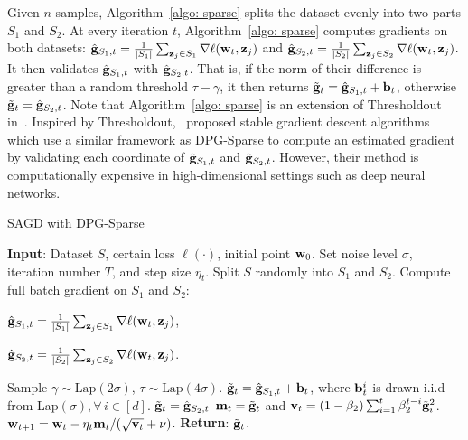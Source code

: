 \documentclass[11pt]{article}
\begin{document}
Given $n$ samples, Algorithm~\ref{algo: sparse} splits the dataset evenly into two parts $S_1$ and $S_2$. At every iteration $t$, Algorithm~\ref{algo: sparse}  computes gradients on both datasets:
$\hat {\mathbf{g}}_{S_1,t} = \frac{1}{|S_1|} \sum_{\mathbf{z}_j \in S_1}\nabla \ell(\mathbf{w}_t, \mathbf{z}_j)$ and $\hat {\mathbf{g}}_{S_2,t} = \frac{1}{|S_2|} \sum_{\mathbf{z}_j \in S_2}\nabla \ell(\mathbf{w}_t, \mathbf{z}_j)$.
It then validates $\hat {\mathbf{g}}_{S_1,t} $ with $\hat {\mathbf{g}}_{S_2,t}$. That is, if the norm of their difference is greater than a random threshold $\tau-\gamma$, it then returns $\tilde {\mathbf{g}}_t = \hat {\mathbf{g}}_{S_1,t} + \mathbf{b}_t$, otherwise $\tilde {\mathbf{g}}_t = \hat {\mathbf{g}}_{S_2,t}$. 
Note that Algorithm~\ref{algo: sparse} is an extension of Thresholdout in~\citet{zhch2018}.
Inspired by Thresholdout,~\citet{zhch2018} proposed stable gradient descent algorithms which use a similar framework as DPG-Sparse to compute an estimated gradient by validating each coordinate of $\hat {\mathbf{g}}_{S_1,t}$ and $\hat {\mathbf{g}}_{S_2,t}$. However, their  method is computationally expensive in high-dimensional settings such as deep neural networks. 



\begin{algorithm}[t]
\caption{\textsc{SAGD} with DPG-Sparse}
\begin{algorithmic}[1]
\label{algo: sparse}
\STATE \textbf{Input}: Dataset $S$,  certain loss $\ell(\cdot)$, initial point $\mathbf{w}_0$.
\STATE Set  noise level $\sigma$, iteration number $T$,  and step size $\eta_t$.
\STATE Split $S$ randomly into $S_1$ and $S_2$. 
\STATE   Compute full batch gradient on $S_1$ and $S_2$:\\
\centerline{$\hat {\mathbf{g}}_{S_1,t} = \frac{1}{|S_1|} \sum_{\mathbf{z}_j \in S_1}\nabla \ell(\mathbf{w}_t, \mathbf{z}_j)$,}
\centerline{$\hat {\mathbf{g}}_{S_2,t} = \frac{1}{|S_2|} \sum_{\mathbf{z}_j \in S_2}\nabla \ell(\mathbf{w}_t, \mathbf{z}_j)$.}
\STATE Sample $\gamma \sim \text{Lap}(2\sigma)$, $\tau \sim \text{Lap}(4\sigma)$.
\STATE  $\tilde {\mathbf{g}}_t = \hat {\mathbf{g}}_{S_1,t} + \mathbf{b}_t$, where $\mathbf{b}_t^i$ is drawn i.i.d from Lap$(\sigma), \forall\, i \in [d]$.
\ELSE \STATE $\tilde {\mathbf{g}}_t = \hat {\mathbf{g}}_{S_2,t}$
\ENDIF
\STATE 
$\mathbf{m}_t = \tilde {\mathbf{g}}_t$ and $\mathbf{v}_t = \left(1-\beta_{2}\right) \sum_{i=1}^{t} \beta_{2}^{t-i} \tilde {\mathbf{g}}_{i}^{2}$.
\STATE $\mathbf{w}_{t+1}=\mathbf{w}_{t}-\eta_t \mathbf{m}_t /(\sqrt{\mathbf{v}_t}+\nu)$.
\ENDFOR 
\STATE \textbf{Return}: $\tilde {\mathbf{g}}_t$.
\end{algorithmic}
\end{algorithm}
\end{document}
